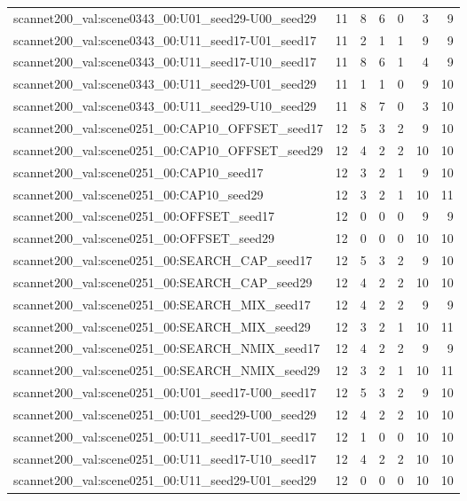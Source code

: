 \begin{table}[t]
\begin{tabular}{lrrrrrr}
scannet200\_val:scene0343\_00:U01\_seed29-U00\_seed29 & 11 & 8 & 6 & 0 & 3 & 9 \\
scannet200\_val:scene0343\_00:U11\_seed17-U01\_seed17 & 11 & 2 & 1 & 1 & 9 & 9 \\
scannet200\_val:scene0343\_00:U11\_seed17-U10\_seed17 & 11 & 8 & 6 & 1 & 4 & 9 \\
scannet200\_val:scene0343\_00:U11\_seed29-U01\_seed29 & 11 & 1 & 1 & 0 & 9 & 10 \\
scannet200\_val:scene0343\_00:U11\_seed29-U10\_seed29 & 11 & 8 & 7 & 0 & 3 & 10 \\
scannet200\_val:scene0251\_00:CAP10\_OFFSET\_seed17 & 12 & 5 & 3 & 2 & 9 & 10 \\
scannet200\_val:scene0251\_00:CAP10\_OFFSET\_seed29 & 12 & 4 & 2 & 2 & 10 & 10 \\
scannet200\_val:scene0251\_00:CAP10\_seed17 & 12 & 3 & 2 & 1 & 9 & 10 \\
scannet200\_val:scene0251\_00:CAP10\_seed29 & 12 & 3 & 2 & 1 & 10 & 11 \\
scannet200\_val:scene0251\_00:OFFSET\_seed17 & 12 & 0 & 0 & 0 & 9 & 9 \\
scannet200\_val:scene0251\_00:OFFSET\_seed29 & 12 & 0 & 0 & 0 & 10 & 10 \\
scannet200\_val:scene0251\_00:SEARCH\_CAP\_seed17 & 12 & 5 & 3 & 2 & 9 & 10 \\
scannet200\_val:scene0251\_00:SEARCH\_CAP\_seed29 & 12 & 4 & 2 & 2 & 10 & 10 \\
scannet200\_val:scene0251\_00:SEARCH\_MIX\_seed17 & 12 & 4 & 2 & 2 & 9 & 9 \\
scannet200\_val:scene0251\_00:SEARCH\_MIX\_seed29 & 12 & 3 & 2 & 1 & 10 & 11 \\
scannet200\_val:scene0251\_00:SEARCH\_NMIX\_seed17 & 12 & 4 & 2 & 2 & 9 & 9 \\
scannet200\_val:scene0251\_00:SEARCH\_NMIX\_seed29 & 12 & 3 & 2 & 1 & 10 & 11 \\
scannet200\_val:scene0251\_00:U01\_seed17-U00\_seed17 & 12 & 5 & 3 & 2 & 9 & 10 \\
scannet200\_val:scene0251\_00:U01\_seed29-U00\_seed29 & 12 & 4 & 2 & 2 & 10 & 10 \\
scannet200\_val:scene0251\_00:U11\_seed17-U01\_seed17 & 12 & 1 & 0 & 0 & 10 & 10 \\
scannet200\_val:scene0251\_00:U11\_seed17-U10\_seed17 & 12 & 4 & 2 & 2 & 10 & 10 \\
scannet200\_val:scene0251\_00:U11\_seed29-U01\_seed29 & 12 & 0 & 0 & 0 & 10 & 10 \\

\end{tabular}
\end{table}
